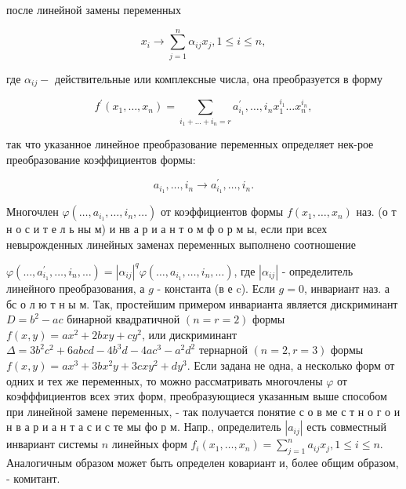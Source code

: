 \documentclass[10pt]{article}
\begin{document}
после линейной замены переменных



\[

x_{i} \rightarrow \sum_{j=1}^{n} \alpha_{i j} x_{j}, 1 \leqslant i \leqslant n,

\]



где $\alpha_{i j}-$ действительные или комплексные числа, она преобразуется в форму



\[

f^{\prime}\left(x_{1}, \ldots, x_{n}\right)=\sum_{i_{1}+\ldots+i_{n}=r} a_{i_{1}}^{\prime}, \ldots, i_{n} x_{1}^{i_{1}} \ldots x_{n}^{i_{n}},

\]



так что указанное линейное преобразование переменных определяет нек-рое преобразование коэффициентов формы:



\[

a_{i_{1}}, \ldots, i_{n} \rightarrow a_{i_{1}}^{\prime}, \ldots, i_{n} .

\]



Многочлен $\varphi\left(\ldots, a_{i_{1}}, \ldots, i_{n}, \ldots\right)$ от коэффициентов формы $f\left(x_{1}, \ldots, x_{n}\right)$ наз. (о т н о с и т е л ь ны м) и нв а р и а н т о м ф о р м ы, если при всех невырожденных линейных заменах переменных выполнено соотношение



$\varphi\left(\ldots, a_{i_{1}}^{\prime}, \ldots, i_{n}, \ldots\right)=\left|\alpha_{i j}\right|^{q} \varphi\left(\ldots, a_{i_{1}}, \ldots, i_{n}, \ldots\right)$, где $\left|\alpha_{i j}\right|$ - определитель линейного преобразования, а $g$ - константа (в е c). Если $g=0$, инвариант наз. а бс о л ю т н ы м. Так, простейшим примером инварианта является дискриминант $D=b^{2}-a c$ бинарной квадратичной $(n=r=2)$ формы $f(x, y)=a x^{2}+2 b x y+c y^{2}$, или дискриминант $\Delta=3 b^{2} c^{2}+6 a b c d-4 b^{3} d-4 a c^{3}-a^{2} d^{2}$ тернарной $(n=2, r=3)$ формы $f(x, y)=a x^{3}+3 b x^{2} y+3 c x y^{2}+d y^{3}$. Если задана не одна, а несколько форм от одних и тех же переменных, то можно рассматривать многочлены $\varphi$ от коэфффициентов всех этих форм, преобразующиеся указанным выше способом при линейной замене переменных, - так получается понятие с о в ме с т н о г о и н в а р и а н т а с и с те мы фо р м. Напр., определитель $\left|a_{i j}\right|$ есть совместный инвариант системы $n$ линейных форм $f_{i}\left(x_{1}, \ldots, x_{n}\right)=\sum_{j=1}^{n} a_{i j} x_{j}, 1 \leqslant i \leqslant n$. Аналогичным образом может быть определен ковариант и, более общим образом, - комитант.
\end{document}
